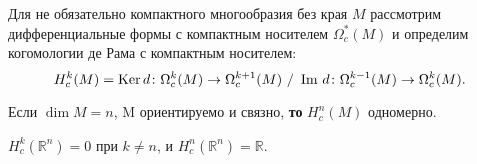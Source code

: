 \begin{to_tas}
	Для не обязательно компактного многообразия без края $M$ рассмотрим дифференциальные формы с компактным носителем $\Omega_c^*(M)$ и определим когомологии де Рама с компактным носителем:
	\begin{equation*}
		H_c^k (M) = \mathop{\mathrm{Ker}}\nolimits d \colon \Omega_c^k (M) \rightarrow \Omega^{k+1}_c (M) \ / \ \mathop{\mathrm{Im}}\nolimits \, d \colon \Omega_c^{k-1}(M) \rightarrow \Omega_c^{k}(M).
	\end{equation*}

	Если $ \dim M = n$, M ориентируемо и связно, \textbf{то} $H_c^n(M)$ одномерно.
\end{to_tas}

\begin{to_tas}
	$H_c^k (\mathbb{R}^n) = 0$ при $k \neq n$, и $H_c^n(\mathbb{R}^n) = \mathbb{R} $.
\end{to_tas}
